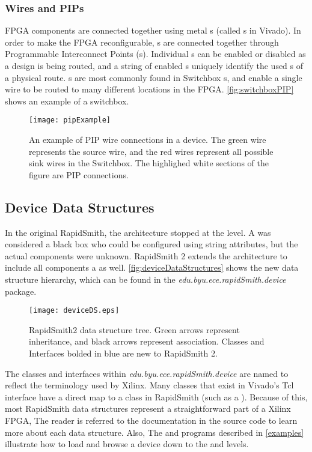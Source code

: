 \subsubsection{Wires and PIPs} \label{wireSection}
 
FPGA components are connected together using metal s (called
s in Vivado). In order to make the FPGA reconfigurable,
s are connected together through Programmable Interconnect Points
(s). Individual s can be enabled or disabled as a design is
being routed, and a string of enabled s uniquely identify the
used s of a physical route. s are most commonly
found in Switchbox s, and enable a single wire to be routed to many
different locations in the FPGA. \autoref{fig:switchboxPIP} shows an
example of a switchbox.

\begin{figure}[H]
	\centering
	\texttt{[image: pipExample]}
	\caption{An example of PIP wire connections in a device. The green wire
	represents the source wire, and the red wires represent all possible sink
	wires in the Switchbox. The highlighed white sections of the figure are PIP
	connections.}
	\label{fig:switchboxPIP}
\end{figure} 
 
\subsection{Device Data Structures} \label{devicesRS2}
In the original RapidSmith, the  architecture stopped at the
 level. A  was considered a black box who could be
configured using string attributes, but the actual components were unknown.
RapidSmith 2 extends the  architecture to include all components
 a  as well. \autoref{fig:deviceDataStructures}
shows the new data structure hierarchy, which can be found in the {\em
edu.byu.ece.rapidSmith.device} package.

\begin{figure}[H]
	\centering
	\texttt{[image: deviceDS.eps]}
	\caption{RapidSmith2  data structure tree. Green arrows represent
	inheritance, and black arrows represent association. Classes and Interfaces
	bolded in blue are new to RapidSmith 2.}
	\label{fig:deviceDataStructures}
\end{figure}

\noindent
The classes and interfaces within {\em edu.byu.ece.rapidSmith.device} are named
to reflect the terminology used by Xilinx. Many classes that exist in Vivado's
Tcl interface have a direct map to a class in RapidSmith (such as a ).
Because of this, most RapidSmith data structures represent a straightforward
part of a Xilinx FPGA, The reader is referred to the documentation in the
source code to learn more about each data structure. Also, The
 and  programs described in 
\autoref{examples} illustrate how to load and browse a device down to the
 and  levels.


